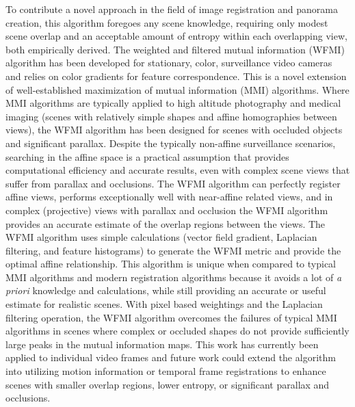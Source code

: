 %
%
%
%
%

%
%


\begin{doublespace}

To contribute a novel approach in the field of image registration and panorama creation, this algorithm foregoes any scene knowledge, requiring only modest scene overlap and an acceptable amount of entropy within each overlapping view, both empirically derived. The weighted and filtered mutual information (WFMI) algorithm has been developed for stationary, color, surveillance video cameras and relies on color gradients for feature correspondence. This is a novel extension of well-established maximization of mutual information (MMI) algorithms. Where MMI algorithms are typically applied to high altitude photography and medical imaging (scenes with relatively simple shapes and affine homographies between views), the WFMI algorithm has been designed for scenes with occluded objects and significant parallax. Despite the typically non-affine surveillance scenarios, searching in the affine space is a practical assumption that provides computational efficiency and accurate results, even with complex scene views that suffer from parallax and occlusions. The WFMI algorithm can perfectly register affine views, performs exceptionally well with near-affine related views, and in complex (projective) views with parallax and occlusion the WFMI algorithm provides an accurate estimate of the overlap regions between the views. The WFMI algorithm uses simple calculations (vector field gradient, Laplacian filtering, and feature histograms) to generate the WFMI metric and provide the optimal affine relationship. This algorithm is unique when compared to typical MMI algorithms and modern registration algorithms because it avoids a lot of \textit{a priori} knowledge and calculations, while still providing an accurate or useful estimate for realistic scenes. With pixel based weightings and the Laplacian filtering operation, the WFMI algorithm overcomes the failures of typical MMI algorithms in scenes where complex or occluded shapes do not provide sufficiently large peaks in the mutual information maps. This work has currently been applied to individual video frames and future work could extend the algorithm into utilizing motion information or temporal frame registrations to enhance scenes with smaller overlap regions, lower entropy, or significant parallax and occlusions.

\end{doublespace}

